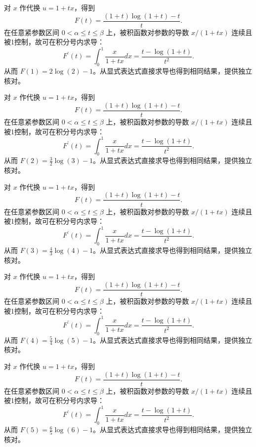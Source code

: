 \documentclass[UTF8,12pt,a4paper,fontset=fandol]{ctexart}
\begin{document}
\begin{solve}\label{ans:c20q19}
对 $x$ 作代换 $u=1+tx$，得到
\[
F(t)=\frac{(1+t)\log(1+t)-t}{t}.
\]
在任意紧参数区间 $0<\alpha\le t\le\beta$ 上，被积函数对参数的导数 $x/(1+tx)$ 连续且被1控制，故可在积分号内求导：
\[
F^{\prime}(t)=\int_0^1\frac{x}{1+tx}dx=\frac{t-\log(1+t)}{t^2}.
\]
从而 $F(1)=2\log(2)-1$。从显式表达式直接求导也得到相同结果，提供独立核对。
\end{solve}

\begin{solve}\label{ans:c20q20}
对 $x$ 作代换 $u=1+tx$，得到
\[
F(t)=\frac{(1+t)\log(1+t)-t}{t}.
\]
在任意紧参数区间 $0<\alpha\le t\le\beta$ 上，被积函数对参数的导数 $x/(1+tx)$ 连续且被1控制，故可在积分号内求导：
\[
F^{\prime}(t)=\int_0^1\frac{x}{1+tx}dx=\frac{t-\log(1+t)}{t^2}.
\]
从而 $F(2)=\frac{3}{2}\log(3)-1$。从显式表达式直接求导也得到相同结果，提供独立核对。
\end{solve}

\begin{solve}\label{ans:c20q21}
对 $x$ 作代换 $u=1+tx$，得到
\[
F(t)=\frac{(1+t)\log(1+t)-t}{t}.
\]
在任意紧参数区间 $0<\alpha\le t\le\beta$ 上，被积函数对参数的导数 $x/(1+tx)$ 连续且被1控制，故可在积分号内求导：
\[
F^{\prime}(t)=\int_0^1\frac{x}{1+tx}dx=\frac{t-\log(1+t)}{t^2}.
\]
从而 $F(3)=\frac{4}{3}\log(4)-1$。从显式表达式直接求导也得到相同结果，提供独立核对。
\end{solve}

\begin{solve}\label{ans:c20q22}
对 $x$ 作代换 $u=1+tx$，得到
\[
F(t)=\frac{(1+t)\log(1+t)-t}{t}.
\]
在任意紧参数区间 $0<\alpha\le t\le\beta$ 上，被积函数对参数的导数 $x/(1+tx)$ 连续且被1控制，故可在积分号内求导：
\[
F^{\prime}(t)=\int_0^1\frac{x}{1+tx}dx=\frac{t-\log(1+t)}{t^2}.
\]
从而 $F(4)=\frac{5}{4}\log(5)-1$。从显式表达式直接求导也得到相同结果，提供独立核对。
\end{solve}

\begin{solve}\label{ans:c20q23}
对 $x$ 作代换 $u=1+tx$，得到
\[
F(t)=\frac{(1+t)\log(1+t)-t}{t}.
\]
在任意紧参数区间 $0<\alpha\le t\le\beta$ 上，被积函数对参数的导数 $x/(1+tx)$ 连续且被1控制，故可在积分号内求导：
\[
F^{\prime}(t)=\int_0^1\frac{x}{1+tx}dx=\frac{t-\log(1+t)}{t^2}.
\]
从而 $F(5)=\frac{6}{5}\log(6)-1$。从显式表达式直接求导也得到相同结果，提供独立核对。
\end{solve}
\end{document}
